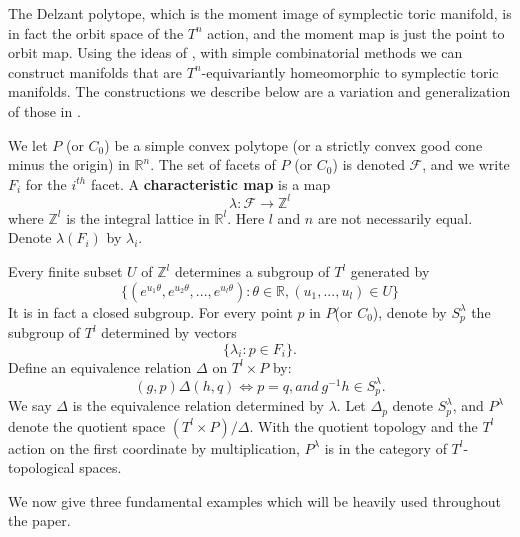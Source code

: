 \documentclass[12pt]{amsart}
\def\Z {{\mathbb{Z}}}
\def\R {{\mathbb{R}}}
\def\F {{\mathcal{F}}}
\theoremstyle{definition}
\numberwithin{equation}{section}
\begin{document}
The Delzant polytope, which is the moment image of symplectic toric
manifold, is in fact the orbit space of the $T^n$ action, and the
moment map is just the point to orbit map. Using the ideas of
\cite{DJ}, with simple combinatorial methods we can construct
manifolds that are $T^n$-equivariantly homeomorphic to symplectic
toric manifolds. The constructions we describe below are a variation
and generalization of those in \cite{DJ}.

We let $P$ (or $C_{0}$) be a simple convex polytope (or a strictly
convex good cone minus the origin) in $\R^n$. The set of facets of
$P$ (or $C_{0}$) is denoted $\F$, and we write $F_{i}$ for the
$i^{th}$ facet. A {\bf characteristic map} is a map
\begin{equation*}
\lambda: \F\rightarrow \Z^l
 \end{equation*}
 where $\Z^l$ is the integral lattice in $\R^l$. Here $l$
and $n$ are not necessarily equal. Denote $\lambda(F_{i})$ by
$\lambda_{i}$.

Every finite subset $U$ of $\Z^l$ determines a subgroup of $T^l$
generated by
\begin{equation*}\{(e^{u_{1}\theta},e^{u_{2}\theta},...,e^{u_{l}\theta}):\theta\in
\R,(u_{1},...,u_{l})\in U\}\end{equation*} It is in fact a closed
subgroup. For every point $p$ in $P$(or $C_{0}$), denote by
$S^{\lambda}_{p}$ the subgroup of $T^l$ determined by vectors
\begin{equation*}\{\lambda_{i}:p\in F_{i}\}.\end{equation*}
Define an equivalence relation $\Delta$ on $T^{l}\times P$ by:
\begin{equation}
(g,p)\Delta (h,q) \Leftrightarrow  p=q, and\ g^{-1}h\in
S^{\lambda}_{p}.
\end{equation}
 We say $\Delta$ is the equivalence relation
determined by $\lambda$. Let $\Delta_{p}$ denote $S^{\lambda}_{p}$,
and $P^{\lambda}$ denote the quotient space $(T^{l}\times
P)/\Delta$. With the quotient topology and the $T^{l}$ action on the
first coordinate by multiplication, $P^{\lambda}$ is in the category
of $T^{l}$-topological spaces.

We now give three fundamental examples which will be heavily used
throughout the paper.
\end{document}
